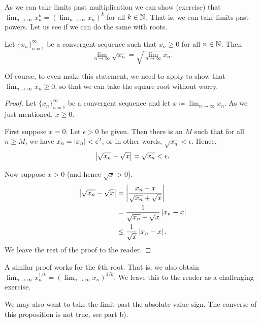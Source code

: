 As we can take limits past multiplication we can show (exercise)
that $\lim_{n\to\infty} x_n^k = {(\lim_{n\to\infty} x_n)}^k$ for all $k \in {\mathbb{N}}$.
That is, we can take limits
past powers.  Let us see if we can do the same with roots.

\begin{prop}
\pagebreak[2]
Let $\{ x_n \}_{n=1}^\infty$ be a convergent sequence such
that $x_n \geq 0$ for all $n \in {\mathbb{N}}$.
Then
\begin{equation*}
\lim_{n\to\infty} \sqrt{x_n} =
\sqrt{ \lim_{n\to\infty} x_n } .
\end{equation*}
\end{prop}

Of course, to even make this statement, we need to apply
 to show
that
$\lim_{n\to\infty} x_n \geq 0$, so that we can take the square root without
worry.

\begin{proof}
Let $\{ x_n \}_{n=1}^\infty$ be a convergent sequence and let $x \coloneqq
\lim_{n\to\infty} x_n$.
As we just mentioned, $x \geq 0$.

First suppose $x=0$.  Let $\epsilon > 0$ be given.
Then there is an $M$ such that for all $n \geq M$, we have
$x_n = \left\lvert {x_n} \right\rvert < \epsilon^2$, or in other words, $\sqrt{x_n} < \epsilon$.
Hence,
\begin{equation*}
\left\lvert {\sqrt{x_n} - \sqrt{x}} \right\rvert =
\sqrt{x_n} < \epsilon.
\end{equation*}

Now suppose $x > 0$ (and hence $\sqrt{x} > 0$).
\begin{equation*}
\begin{split}
\left\lvert {\sqrt{x_n}-\sqrt{x}} \right\rvert &= 
\left\lvert {\frac{x_n-x}{\sqrt{x_n}+\sqrt{x}}} \right\rvert \\
&=
\frac{1}{\sqrt{x_n}+\sqrt{x}}
\left\lvert {x_n-x} \right\rvert \\
& \leq
\frac{1}{\sqrt{x}}
\left\lvert {x_n-x} \right\rvert .
\end{split}
\end{equation*}
We leave the rest of the proof to the reader.
\end{proof}

A similar proof works for the $k$th root.  That is, we also
obtain
$\lim_{n\to\infty} x_n^{1/k} = {( \lim_{n\to\infty} x_n )}^{1/k}$.  We leave this to the reader
as a challenging exercise.

We may also want to take the limit past the absolute value sign.
The converse of this proposition is not true, see
 part b).

